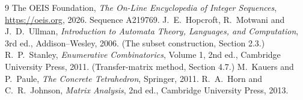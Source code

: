 \documentclass[11pt,a4paper]{article}
\theoremstyle{plain}
\theoremstyle{definition}
\begin{document}
\begin{thebibliography}{9}
 The OEIS Foundation, \emph{The On-Line Encyclopedia of Integer
Sequences}, \url{https://oeis.org}, 2026. Sequence A219769.
 J.~E.~Hopcroft, R.~Motwani and J.~D.~Ullman, \emph{Introduction to Automata
Theory, Languages, and Computation}, 3rd ed., Addison--Wesley, 2006. (The subset
construction, Section 2.3.)
 R.~P.~Stanley, \emph{Enumerative Combinatorics}, Volume 1, 2nd ed.,
Cambridge University Press, 2011. (Transfer-matrix method, Section 4.7.)
 M.~Kauers and P.~Paule, \emph{The Concrete Tetrahedron}, Springer, 2011.
 R.~A.~Horn and C.~R.~Johnson, \emph{Matrix Analysis}, 2nd ed., Cambridge
University Press, 2013.
\end{thebibliography}
\end{document}
